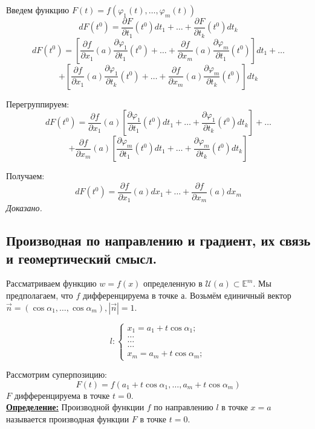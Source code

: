 \documentclass[a4paper,12pt]{article} %
\begin{document}
 Введем функцию $F(t) = f(\varphi_1(t), \ldots, \varphi_m(t))$
 \[dF(t^0) = \frac{\partial F}{\partial t_1}(t^0)dt_1 + \ldots +\frac{\partial F}{\partial t_k}(t^0)dt_k \]
 \[dF(t^0) = \left[\frac{\partial f}{\partial x_1}(a) \frac{\partial \varphi_1}{\partial t_1}(t^0) + \ldots + \frac{\partial f}{\partial x_m}(a) \frac{\partial \varphi_m}{\partial t_1}(t^0) \right]dt_1 + \ldots\]
 \[+ \left[\frac{\partial f}{\partial x_1}(a) \frac{\partial \varphi_1}{\partial t_k}(t^0) + \ldots + \frac{\partial f}{\partial x_m}(a) \frac{\partial \varphi_m}{\partial t_k}(t^0) \right] dt_k\]
 
 Перегруппируем:
 \[dF(t^0) = \frac{\partial f}{\partial x_1}(a) \left[\frac{\partial \varphi_1}{\partial t_1}(t^0) dt_1 + \ldots + \frac{\partial \varphi_1}{\partial t_k}(t^0) dt_k \right] + \ldots\] \[+\frac{\partial f}{\partial x_m}(a) \left[ \frac{\partial \varphi_m}{\partial t_1}(t^0) dt_1 + \ldots + \frac{\partial \varphi_m}{\partial t_k}(t^0) dt_k \right]\]
 
 Получаем:
 \[dF(t^0) = \frac{\partial f}{\partial x_1}(a)dx_1 + \ldots + \frac{\partial f}{\partial x_m}(a)dx_m\]
 \textit{Доказано.}
 
 \subsection{Производная по направлению и градиент, их связь и  геомертический смысл.}
 Рассматриваем функцию $w = f(x)$ определенную в $\mathscr{U}(a) \subset \mathds{E}^m$. Мы предполагаем, что $f$ дифференцируема в точке а. Возьмём единичный вектор $\vec{n} = (\cos \alpha_1, \ldots, \cos \alpha_m), |\vec{n}| = 1$.
 
 \begin{equation*}
 	l: 
 	\begin{cases}
 		x_1 = a_1 + t\cos \alpha_1;\\
 		\ldots\\
 		\ldots\\
 		\ldots\\
 		x_m = a_m + t\cos \alpha_m;
 	\end{cases}
 \end{equation*}
 
 Рассмотрим суперпозицию:
 \[F(t) = f(a_1 + t\cos\alpha_1, \ldots, a_m + t\cos\alpha_m)\]
 $F$ дифференцируема в точке $t = 0$.\\
 
 \underline{\textbf{Определение:}} Производной функции $f$ по направлению $l$ в точке $x = a$ называется производная функции $F$ в точке $t = 0$.\\
 
\end{document}
